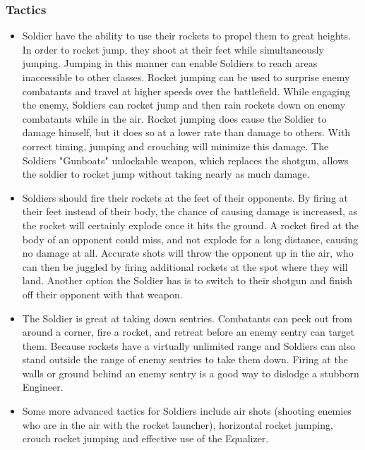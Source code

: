 \subsubsection {Tactics}
\begin {itemize} 

\item Soldier have the ability to use their rockets to propel them to great heights.  In order to rocket jump, they shoot at their feet while simultaneously jumping. Jumping in this manner can enable Soldiers to reach areas inaccessible to other classes. Rocket jumping can be used to surprise enemy combatants and travel at higher speeds over the battlefield. While engaging the enemy, Soldiers can rocket jump and then rain rockets down on enemy combatants while in the air. Rocket jumping does cause the Soldier to damage himself, but it does so at a lower rate than damage to others. With correct timing, jumping and crouching will minimize this damage. The Soldiers "Gunboats" unlockable weapon, which replaces the shotgun, allows the soldier to rocket jump without taking nearly as much damage.

\item Soldiers should fire their rockets at the feet of their opponents.  By firing at their feet instead of their body, the chance of causing damage is increased, as the rocket will certainly explode once it hits the ground.  A rocket fired at the body of an opponent could miss, and not explode for a long distance, causing no damage at all.  Accurate shots will throw the opponent up in the air, who can then be juggled by firing additional rockets at the spot where they will land.  Another option the Soldier has is to switch to their shotgun and finish off their opponent with that weapon.

\item The Soldier is great at taking down sentries. Combatants can peek out from around a corner, fire a rocket, and retreat before an enemy sentry can target them. Because rockets have a virtually unlimited range and Soldiers can also stand outside the range of enemy sentries to take them down. Firing at the walls or ground behind an enemy sentry is a good way to dislodge a stubborn Engineer. 

\item Some more advanced tactics for Soldiers include air shots (shooting enemies who are in the air with the rocket launcher), horizontal rocket jumping, crouch rocket jumping and effective use of the Equalizer.

\end {itemize}